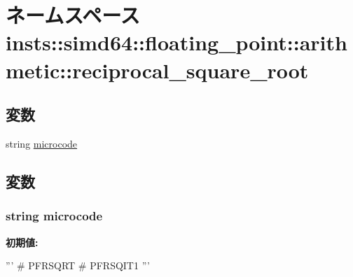 \hypertarget{namespaceinsts_1_1simd64_1_1floating__point_1_1arithmetic_1_1reciprocal__square__root}{
\section{ネームスペース insts::simd64::floating\_\-point::arithmetic::reciprocal\_\-square\_\-root}
\label{namespaceinsts_1_1simd64_1_1floating__point_1_1arithmetic_1_1reciprocal__square__root}
}
\subsection*{変数}
\begin{DoxyCompactItemize}
\item 
string \hyperlink{namespaceinsts_1_1simd64_1_1floating__point_1_1arithmetic_1_1reciprocal__square__root_a770f11a173e99389a8802f0107ed8f52}{microcode}
\end{DoxyCompactItemize}


\subsection{変数}
\hypertarget{namespaceinsts_1_1simd64_1_1floating__point_1_1arithmetic_1_1reciprocal__square__root_a770f11a173e99389a8802f0107ed8f52}{
\subsubsection[{microcode}]{\setlength{\rightskip}{0pt plus 5cm}string {\bf microcode}}}
\label{namespaceinsts_1_1simd64_1_1floating__point_1_1arithmetic_1_1reciprocal__square__root_a770f11a173e99389a8802f0107ed8f52}
{\bfseries 初期値:}
\begin{DoxyCode}
'''
# PFRSQRT
# PFRSQIT1
'''
\end{DoxyCode}
